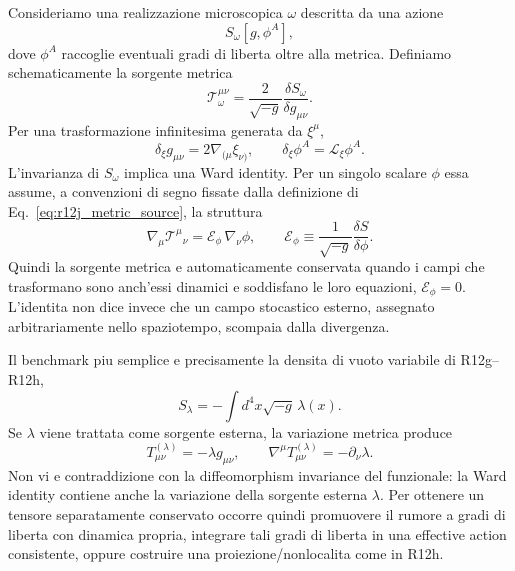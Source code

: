 \documentclass[11pt,a4paper]{article}
\begin{document}
Consideriamo una realizzazione microscopica $\omega$ descritta da una azione
\begin{equation}
 S_\omega[g,\phi^A],
\end{equation}
dove $\phi^A$ raccoglie eventuali gradi di liberta oltre alla metrica. Definiamo schematicamente la sorgente metrica
\begin{equation}
 \mathcal T^{\mu\nu}_\omega
 =\frac{2}{\sqrt{-g}}\frac{\delta S_\omega}{\delta g_{\mu\nu}}.
 \label{eq:r12j_metric_source}
\end{equation}
Per una trasformazione infinitesima generata da $\xi^\mu$,
\begin{equation}
 \delta_\xi g_{\mu\nu}=2\nabla_{(\mu}\xi_{\nu)},
 \qquad
 \delta_\xi\phi^A=\mathcal L_\xi\phi^A.
\end{equation}
L'invarianza di $S_\omega$ implica una Ward identity. Per un singolo scalare $\phi$ essa assume, a convenzioni di segno fissate dalla definizione di Eq.~\eqref{eq:r12j_metric_source}, la struttura
\begin{equation}
 \boxed{
 \nabla_\mu\mathcal T^{\mu}{}_{\nu}
 =\mathcal E_\phi\,\nabla_\nu\phi,
 }
 \qquad
 \mathcal E_\phi\equiv\frac{1}{\sqrt{-g}}\frac{\delta S}{\delta\phi}.
 \label{eq:r12j_ward_scalar}
\end{equation}
Quindi la sorgente metrica e automaticamente conservata quando i campi che trasformano sono anch'essi dinamici e soddisfano le loro equazioni, $\mathcal E_\phi=0$. L'identita non dice invece che un campo stocastico esterno, assegnato arbitrariamente nello spaziotempo, scompaia dalla divergenza.

Il benchmark piu semplice e precisamente la densita di vuoto variabile di R12g--R12h,
\begin{equation}
 S_\lambda=-\int d^4x\sqrt{-g}\,\lambda(x).
\end{equation}
Se $\lambda$ viene trattata come sorgente esterna, la variazione metrica produce
\begin{equation}
 T^{(\lambda)}_{\mu\nu}=-\lambda g_{\mu\nu},
 \qquad
 \boxed{\nabla^\mu T^{(\lambda)}_{\mu\nu}=-\partial_\nu\lambda}.
 \label{eq:r12j_external_lambda}
\end{equation}
Non vi e contraddizione con la diffeomorphism invariance del funzionale: la Ward identity contiene anche la variazione della sorgente esterna $\lambda$. Per ottenere un tensore separatamente conservato occorre quindi promuovere il rumore a gradi di liberta con dinamica propria, integrare tali gradi di liberta in una effective action consistente, oppure costruire una proiezione/nonlocalita come in R12h.
\end{document}
